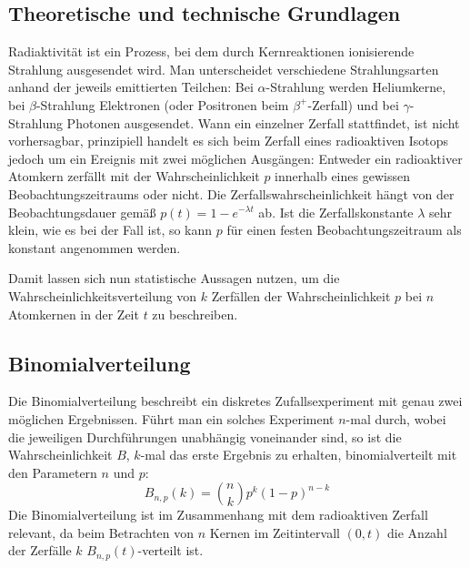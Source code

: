 \subsection[Theoretische und technische Grundlagen]{Theoretische und technische Grundlagen \protect\autocite{Skript_2.2}}
Radiaktivität ist ein Prozess, bei dem durch Kernreaktionen ionisierende Strahlung ausgesendet wird. Man unterscheidet verschiedene Strahlungsarten anhand der jeweils emittierten Teilchen: Bei \(\alpha\)-Strahlung werden Heliumkerne, bei \(\beta\)-Strahlung Elektronen (oder Positronen beim \(\beta^+\)-Zerfall) und bei \(\gamma\)-Strahlung Photonen ausgesendet. Wann ein einzelner Zerfall stattfindet, ist nicht vorhersagbar, prinzipiell handelt es sich beim Zerfall eines radioaktiven Isotops jedoch um ein Ereignis mit zwei möglichen Ausgängen: Entweder ein radioaktiver Atomkern zerfällt mit der Wahrscheinlichkeit \(p\) innerhalb eines gewissen Beobachtungszeitraums oder nicht. Die Zerfallswahrscheinlichkeit hängt von der Beobachtungsdauer gemäß \(p(t)=1-e^{-\lambda t}\) ab. Ist die Zerfallskonstante \(\lambda\) sehr klein, wie es bei  der Fall ist, so kann \(p\) für einen festen Beobachtungszeitraum als konstant angenommen werden. 

Damit lassen sich nun statistische Aussagen nutzen, um die Wahrscheinlichkeitsverteilung von \(k\) Zerfällen der Wahrscheinlichkeit \(p\) bei \(n\) Atomkernen in der Zeit \(t\) zu beschreiben. 

\subsection{Binomialverteilung}
Die Binomialverteilung beschreibt ein diskretes Zufallsexperiment mit genau zwei möglichen Ergebnissen. Führt man ein solches Experiment \(n\)-mal durch, wobei die jeweiligen Durchführungen unabhängig voneinander sind, so ist die Wahrscheinlichkeit \(B\), \(k\)-mal das erste Ergebnis zu erhalten, binomialverteilt mit den Parametern \(n\) und \(p\):
\begin{equation} \label{eq:binomial}
    B_{n,p}(k) = \binom{n}{k} p^k (1-p)^{n-k}
\end{equation}
Die Binomialverteilung ist im Zusammenhang mit dem radioaktiven Zerfall relevant, da beim Betrachten von \(n\) Kernen im Zeitintervall \((0,t)\) die Anzahl der Zerfälle \(k\) \(B_{n,p}(t)\)-verteilt ist.

